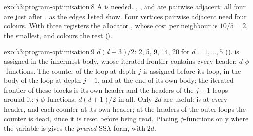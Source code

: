 \begin{solution}{exo:b3:program-optimisation:8}
A  is needed. , ,  and  are pairwise adjacent: all four are  just after , as the edges listed show. Four vertices pairwise adjacent need four colours. With three registers the allocator  , whose cost per neighbour is $10/5 = 2$, the smallest, and colours the rest ().
\end{solution}

\begin{solution}{exo:b3:program-optimisation:9}
$d(d + 3)/2$: 2, 5, 9, 14, 20 for $d = 1, \dots, 5$ ().  is assigned in the innermost body, whose iterated frontier contains every header: $d$ $\phi$-functions. The counter of the loop at depth $j$ is assigned before its loop, in the body of the loop at depth $j - 1$, and at the end of its own body; the iterated frontier of these blocks is its own header and the headers of the $j - 1$ loops around it: $j$ $\phi$-functions, $d(d+1)/2$ in all. Only $2d$ are useful:  is  at every header, and each counter at its own header; at the headers of the outer loops the counter is dead, since it is reset before being read. Placing $\phi$-functions only where the variable is  gives the \emph{pruned} SSA form, with $2d$.
\end{solution}

